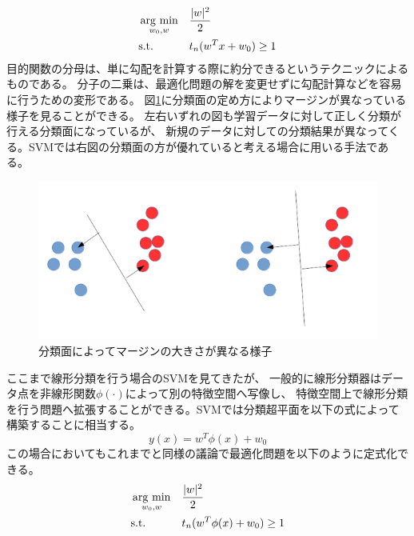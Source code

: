 \begin{equation}
    \begin{aligned}
    & \mathop{\rm arg~min}\limits_{w_0,w}
    & & \frac{|w|^2}{2}  \\
    & \text{s.t.}
    & &  t_n(w^Tx+w_0)  \geq 1 
    \end{aligned}
    \label{eq:obj nonlinear}
\end{equation}
目的関数の分母は、単に勾配を計算する際に約分できるというテクニックによるものである。
分子の二乗は、最適化問題の解を変更せずに勾配計算などを容易に行うための変形である。
図\ref{fig:margin}に分類面の定め方によりマージンが異なっている様子を見ることができる。
左右いずれの図も学習データに対して正しく分類が行える分類面になっているが、
新規のデータに対しての分類結果が異なってくる。SVMでは右図の分類面の方が優れていると考える場合に用いる手法である。
\begin{figure}
    \centering
    \includegraphics[width=12cm]{images/margin.png}
    \caption{分類面によってマージンの大きさが異なる様子}
    \label{fig:margin}
\end{figure}
ここまで線形分類を行う場合のSVMを見てきたが、
一般的に線形分類器はデータ点を非線形関数\(\phi(\cdot)\)によって別の特徴空間へ写像し、
特徴空間上で線形分類を行う問題へ拡張することができる。SVMでは分類超平面を以下の式によって構築することに相当する。
\begin{equation}
    y(x) = w^T \phi (x) + w_0
    \label{eq:displane2}
\end{equation}
この場合においてもこれまでと同様の議論で最適化問題を以下のように定式化できる。
\begin{equation}
    \begin{aligned}
    & \mathop{\rm arg~min}\limits_{w_0,w}
    & & \frac{|w|^2}{2} \\
    & \text{s.t.}
    & &  t_n(w^T\phi(x)+w_0)  \geq 1 
    \end{aligned}
    \label{eq:obj nonlinear}
\end{equation}

